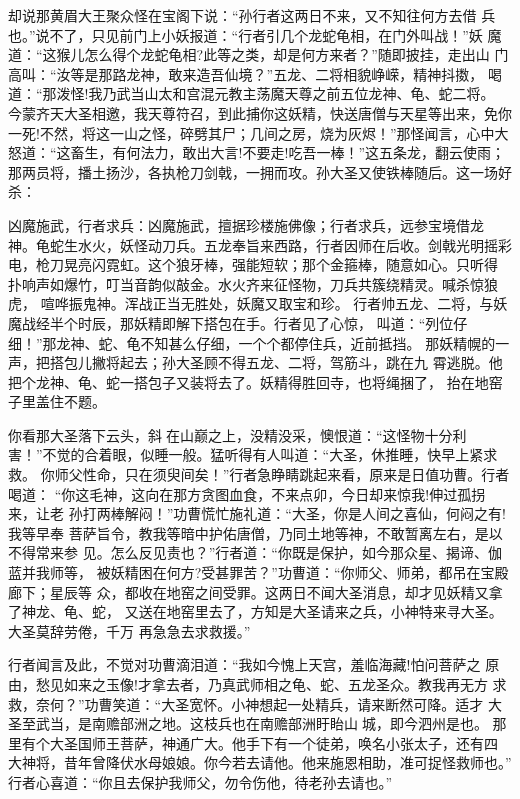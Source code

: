 却说那黄眉大王聚众怪在宝阁下说：“孙行者这两日不来，又不知往何方去借
兵也。”说不了，只见前门上小妖报道：“行者引几个龙蛇龟相，在门外叫战！”妖
魔道：“这猴儿怎么得个龙蛇龟相?此等之类，却是何方来者？”随即披挂，走出山
门高叫：“汝等是那路龙神，敢来造吾仙境？”五龙、二将相貌峥嵘，精神抖擞，
喝道：“那泼怪!我乃武当山太和宫混元教主荡魔天尊之前五位龙神、龟、蛇二将。
今蒙齐天大圣相邀，我天尊符召，到此捕你这妖精，快送唐僧与天星等出来，免你
一死!不然，将这一山之怪，碎劈其尸；几间之房，烧为灰烬！”那怪闻言，心中大
怒道：“这畜生，有何法力，敢出大言!不要走!吃吾一棒！”这五条龙，翻云使雨；
那两员将，播土扬沙，各执枪刀剑戟，一拥而攻。孙大圣又使铁棒随后。这一场好
杀：

凶魔施武，行者求兵：凶魔施武，擅据珍楼施佛像；行者求兵，远参宝境借龙
神。龟蛇生水火，妖怪动刀兵。五龙奉旨来西路，行者因师在后收。剑戟光明摇彩
电，枪刀晃亮闪霓虹。这个狼牙棒，强能短软；那个金箍棒，随意如心。只听得
扑响声如爆竹，叮当音韵似敲金。水火齐来征怪物，刀兵共簇绕精灵。喊杀惊狼虎，
喧哗振鬼神。浑战正当无胜处，妖魔又取宝和珍。
行者帅五龙、二将，与妖魔战经半个时辰，那妖精即解下搭包在手。行者见了心惊，
叫道：“列位仔细！”那龙神、蛇、龟不知甚么仔细，一个个都停住兵，近前抵挡。
那妖精幌的一声，把搭包儿撇将起去；孙大圣顾不得五龙、二将，驾筋斗，跳在九
霄逃脱。他把个龙神、龟、蛇一搭包子又装将去了。妖精得胜回寺，也将绳捆了，
抬在地窑子里盖住不题。

你看那大圣落下云头，斜在山巅之上，没精没采，懊恨道：“这怪物十分利
害！”不觉的合着眼，似睡一般。猛听得有人叫道：“大圣，休推睡，快早上紧求救。
你师父性命，只在须臾间矣！”行者急睁睛跳起来看，原来是日值功曹。行者喝道：
“你这毛神，这向在那方贪图血食，不来点卯，今日却来惊我!伸过孤拐来，让老
孙打两棒解闷！”功曹慌忙施礼道：“大圣，你是人间之喜仙，何闷之有!我等早奉
菩萨旨令，教我等暗中护佑唐僧，乃同土地等神，不敢暂离左右，是以不得常来参
见。怎么反见责也？”行者道：“你既是保护，如今那众星、揭谛、伽蓝并我师等，
被妖精困在何方?受甚罪苦？”功曹道：“你师父、师弟，都吊在宝殿廊下；星辰等
众，都收在地窑之间受罪。这两日不闻大圣消息，却才见妖精又拿了神龙、龟、蛇，
又送在地窑里去了，方知是大圣请来之兵，小神特来寻大圣。大圣莫辞劳倦，千万
再急急去求救援。”

行者闻言及此，不觉对功曹滴泪道：“我如今愧上天宫，羞临海藏!怕问菩萨之
原由，愁见如来之玉像!才拿去者，乃真武师相之龟、蛇、五龙圣众。教我再无方
求救，奈何？”功曹笑道：“大圣宽怀。小神想起一处精兵，请来断然可降。适才
大圣至武当，是南赡部洲之地。这枝兵也在南赡部洲盱眙山城，即今泗州是也。
那里有个大圣国师王菩萨，神通广大。他手下有一个徒弟，唤名小张太子，还有四
大神将，昔年曾降伏水母娘娘。你今若去请他。他来施恩相助，准可捉怪救师也。”
行者心喜道：“你且去保护我师父，勿令伤他，待老孙去请也。”

